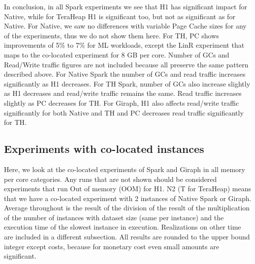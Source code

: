 In conclusion, in all Spark experiments we see that H1 has significant impact for Native, while for TeraHeap H1 is significant too, but not as significant as for Native. For Native, we saw no differences with variable Page Cache sizes for any of the experiments, thus we do not show them here. For TH, PC shows improvements of 5\% to 7\% for ML workloads, except the LinR experiment that maps to the co-located experiment for 8 GB per core. Number of GCs and Read/Write traffic figures are not included because all preserve the same pattern described above. For Native Spark the number of GCs and read traffic increases significantly as H1 decreases. For TH Spark, number of GCs also increase slightly as H1 decreases and read/write traffic remains the same. Read traffic increases slightly as PC decreases for TH. For Giraph, H1 also affects read/write traffic significantly for both Native and TH and PC decreases read traffic significantly for TH.

\subsection{Experiments with co-located instances}

Here, we look at the co-located experiments of Spark and Giraph in all memory per core categories.
Any runs that are not shown should be considered experiments that run Out of memory (OOM) for H1.
N2 (T for TeraHeap) means that we have a co-located experiment with 2 instances of Native Spark or Giraph.
Average throughout is the result of the division of the result of the multiplication of the number of instances with dataset size (same per instance) and the execution time of the slowest instance in execution. Realizations on other time are included in a different subsection.
All results are rounded to the upper bound integer except costs, because for monetary cost even small amounts are significant.

